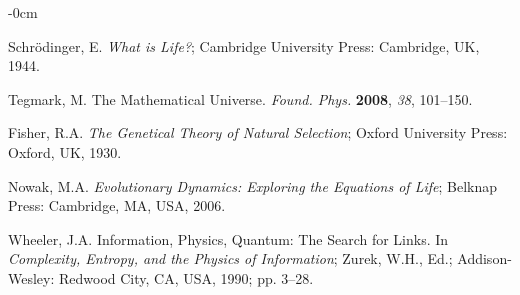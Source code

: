 \documentclass[entropy,article,submit,pdftex,moreauthors]{Definitions/mdpi}
\begin{document}





\acknowledgments{}


\begin{adjustwidth}{-\extralength}{0cm}



%

\begin{thebibliography}{999}

Schrödinger, E. \textit{What is Life?}; Cambridge University Press: Cambridge, UK, 1944.

Tegmark, M. The Mathematical Universe. \textit{Found. Phys.} \textbf{2008}, \textit{38}, 101–150. 

Fisher, R.A. \textit{The Genetical Theory of Natural Selection}; Oxford University Press: Oxford, UK, 1930.

Nowak, M.A. \textit{Evolutionary Dynamics: Exploring the Equations of Life}; Belknap Press: Cambridge, MA, USA, 2006.

Wheeler, J.A. Information, Physics, Quantum: The Search for Links. In \textit{Complexity, Entropy, and the Physics of Information}; Zurek, W.H., Ed.; Addison-Wesley: Redwood City, CA, USA, 1990; pp. 3–28.


\end{thebibliography}
\end{adjustwidth}
\end{document}
